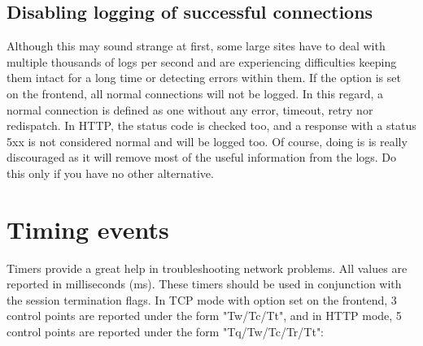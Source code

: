 \subsection{Disabling logging of successful connections}
\label{subsec:disabling_logging_successful_connections}

Although this may sound strange at first, some large sites have to deal with
multiple thousands of logs per second and are experiencing difficulties keeping
them intact for a long time or detecting errors within them. If the option
 is set on the frontend, all normal connections will not be
logged. In this regard, a normal connection is defined as one without any
error, timeout, retry nor redispatch. In HTTP, the status code is checked too,
and a response with a status 5xx is not considered normal and will be logged
too. Of course, doing is is really discouraged as it will remove most of the
useful information from the logs. Do this only if you have no other
alternative.

\section{Timing events}

Timers provide a great help in troubleshooting network problems. All values are
reported in milliseconds (ms). These timers should be used in conjunction with
the session termination flags. In TCP mode with option  set on the
frontend, 3 control points are reported under the form "Tw/Tc/Tt", and in HTTP
mode, 5 control points are reported under the form "Tq/Tw/Tc/Tr/Tt":

